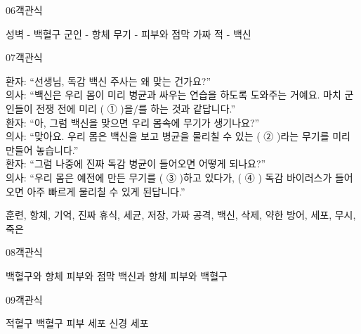 \documentclass[fs95,seriesFre]{korfarm-base}
\begin{document}
\begin{kfQBlock}{06}{객관식}
\begin{kfChoices}
\kfChoice 성벽 - 백혈구
\kfChoice 군인 - 항체
\kfChoice 무기 - 피부와 점막
\kfChoice 가짜 적 - 백신
\end{kfChoices}
\end{kfQBlock}
\begin{kfQBlock}{07}{객관식}
\begin{kfEvidence}환자: “선생님, 독감 백신 주사는 왜 맞는 건가요?” \\\relax
의사: “백신은 우리 몸이 미리 병균과 싸우는 연습을 하도록 도와주는 거예요. 마치 군인들이 전쟁 전에 미리 ( ① )을/를 하는 것과 같답니다.” \\\relax
환자: “아, 그럼 백신을 맞으면 우리 몸속에 무기가 생기나요?” \\\relax
의사: “맞아요. 우리 몸은 백신을 보고 병균을 물리칠 수 있는 ( ② )라는 무기를 미리 만들어 놓습니다.” \\\relax
환자: “그럼 나중에 진짜 독감 병균이 들어오면 어떻게 되나요?” \\\relax
의사: “우리 몸은 예전에 만든 무기를 ( ③ )하고 있다가, ( ④ ) 독감 바이러스가 들어오면 아주 빠르게 물리칠 수 있게 된답니다.”\end{kfEvidence}
\begin{kfChoices}
\kfChoice 훈련, 항체, 기억, 진짜
\kfChoice 휴식, 세균, 저장, 가짜
\kfChoice 공격, 백신, 삭제, 약한
\kfChoice 방어, 세포, 무시, 죽은
\end{kfChoices}
\end{kfQBlock}
\begin{kfQBlock}{08}{객관식}
\begin{kfChoices}
\kfChoice 백혈구와 항체
\kfChoice 피부와 점막
\kfChoice 백신과 항체
\kfChoice 피부와 백혈구
\end{kfChoices}
\end{kfQBlock}
\begin{kfQBlock}{09}{객관식}
\begin{kfChoices}
\kfChoice 적혈구
\kfChoice 백혈구
\kfChoice 피부 세포
\kfChoice 신경 세포
\end{kfChoices}
\end{kfQBlock}
\end{document}
